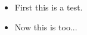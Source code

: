 \documentclass[preview]{standalone}
\begin{document}
\begin{center}
\begin{itemize} \item First this is a test. \item Now this is too... \end{itemize}
\end{center}
\end{document}
